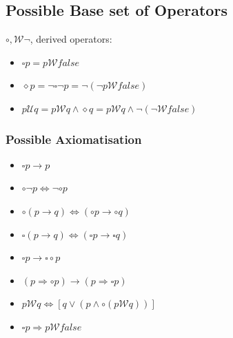 \documentclass[a4paper, 10pt]{article}
\begin{document}
\begin{multicols}{2}
\subsection*{Possible Base set of Operators}
$\circ, \mathcal{W}\neg$, derived operators:
\begin{itemize}
    \item $\square p = p \mathcal{W} false$
    \item $\diamond p=\neg\square\neg p=\neg(\neg p \mathcal{W}false)$
    \item $p \mathcal{U}q=p \mathcal{W}q \wedge \diamond q = p \mathcal{W}q \wedge\neg(\neg \mathcal{W}false)$
\end{itemize}
\subsubsection*{Possible Axiomatisation}
\begin{itemize}
    \item $\square p\to p$
    \item $\circ\neg p\Leftrightarrow\neg\circ p$
    \item $\circ(p\to q)\Leftrightarrow(\circ p\to\circ q)$
    \item $\square(p\to q)\Leftrightarrow(\square p \to \square q)$
    \item $\square p\to\square\circ p$
    \item $(p\Rightarrow\circ p)\to(p\Rightarrow\square p)$
    \item $p \mathcal{W}q\Leftrightarrow[q\vee(p\wedge\circ(p \mathcal{W}q))]$
    \item $\square p\Rightarrow p \mathcal{W}false$
\end{itemize}
\end{multicols}
\end{document}
